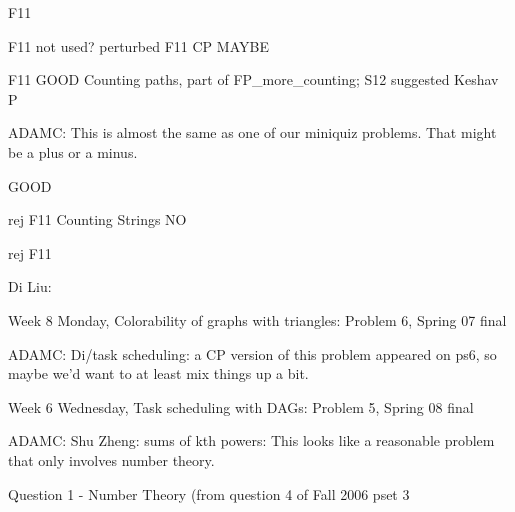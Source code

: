\documentclass[quiz]{mcs}
\begin{document}


\begin{editingnotes}F11\end{editingnotes}

 
\begin{editingnotes}F11 not used? perturbed F11 CP MAYBE\end{editingnotes}


 
\begin{editingnotes}
F11 GOOD Counting paths, part of FP\_more\_counting; S12 suggested
Keshav P

ADAMC: This is almost the same as one of our miniquiz problems.  That
might be a plus or a minus.
\end{editingnotes}


GOOD 

  
\begin{editingnotes}rej F11 Counting Strings NO \end{editingnotes}



\begin{editingnotes}rej F11\end{editingnotes}


\begin{editingnotes}Di Liu:

Week 8 Monday, Colorability of graphs with triangles: Problem 6,
Spring 07 final

ADAMC: Di/task scheduling: a CP version of this problem appeared on
ps6, so maybe we'd want to at least mix things up a bit.

Week 6 Wednesday, Task scheduling with DAGs: Problem 5, Spring 08 final
\end{editingnotes}


\begin{editingnotes}
ADAMC: Shu Zheng: sums of kth powers: This looks like a reasonable
problem that only involves number theory.

Question 1 - Number Theory (from question 4 of Fall 2006 pset 3
\end{editingnotes}
\end{document}
